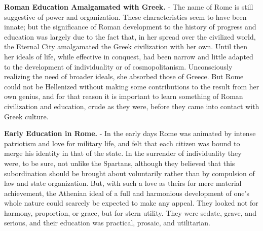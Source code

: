 \documentclass[
]{book}
\begin{document}
\textbf{Roman Education Amalgamated with Greek.} - The name of Rome is still suggestive of power and organization. These characteristics seem to have been innate; but the significance of Roman development to the history of progress and education was largely due to the fact that, in her spread over the civilized world, the Eternal City amalgamated the Greek civilization with her own. Until then her ideals of life, while effective in conquest, had been narrow and little adapted to the development of individuality or of cosmopolitanism. Unconsciously realizing the need of broader ideals, she absorbed those of Greece. But Rome could not be Hellenized without making some contributions to the result from her own genius, and for that reason it is important to learn something of Roman civilization and education, crude as they were, before they came into contact with Greek culture.

\textbf{Early Education in Rome.} - In the early days Rome was animated by intense patriotism and love for military life, and felt that each citizen was bound to merge his identity in that of the state. In the surrender of individuality they were, to be sure, not unlike the Spartans, although they believed that this subordination should be brought about voluntarily rather than by compulsion of law and state organization. But, with such a love as theirs for mere material achievement, the Athenian ideal of a full and harmonious development of one's whole nature could scarcely be expected to make any appeal. They looked not for harmony, proportion, or grace, but for stern utility. They were sedate, grave, and serious, and their education was practical, prosaic, and utilitarian.
\end{document}
